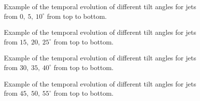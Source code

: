 \begin{figure}
\captionsetup[subfigure]{labelformat=empty}
\centering
{}
\caption{Example of the temporal evolution of different tilt angles for jets from $0,~5,~10^{\circ}$ from top to bottom.}
\label{tj_morph_1}
\end{figure}
\begin{figure}
\captionsetup[subfigure]{labelformat=empty}
\centering
{}
\caption{Example of the temporal evolution of different tilt angles for jets from $15,~20,~25^{\circ}$ from top to bottom.}
\label{tj_morph_2}
\end{figure}
\begin{figure}
\captionsetup[subfigure]{labelformat=empty}
\centering
{}
\caption{Example of the temporal evolution of different tilt angles for jets from $30,~35,~40^{\circ}$ from top to bottom.}
\label{tj_morph_3}
\end{figure}
\begin{figure}
\captionsetup[subfigure]{labelformat=empty}
\centering
{}
\caption{Example of the temporal evolution of different tilt angles for jets from $45,~50,~55^{\circ}$ from top to bottom.}
\label{tj_morph_4}
\end{figure}
